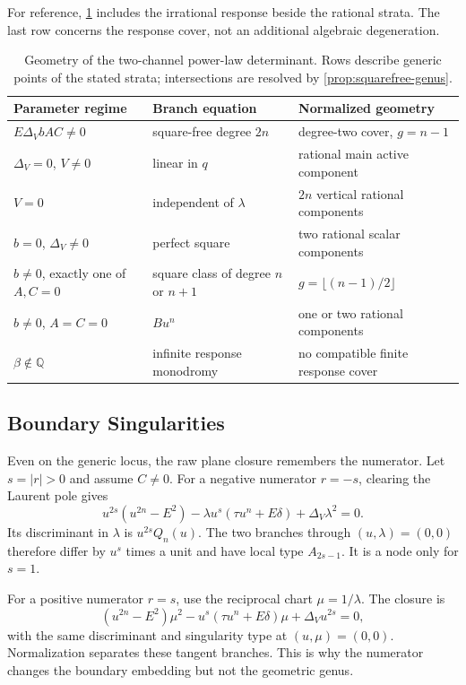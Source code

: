 \documentclass[11pt,reqno]{amsart}
\theoremstyle{remark}
\newcommand{\Q}{\mathbb Q}
\begin{document}
For reference, \cref{tab:regimes} includes the irrational response beside
the rational strata.  The last row concerns the response cover, not an
additional algebraic degeneration.

\begin{table}[t]
\centering
\caption{Geometry of the two-channel power-law determinant.  Rows describe
generic points of the stated strata; intersections are resolved by
\cref{prop:squarefree-genus}.}
\label{tab:regimes}
\begin{tabular}{@{}p{}p{}p{}@{}}
\toprule
Parameter regime & Branch equation & Normalized geometry\\
\midrule
$E\Delta_VbAC\ne0$ & square-free degree $2n$ & degree-two cover, $g=n-1$\\
$\Delta_V=0$, $V\ne0$ & linear in $q$ & rational main active component\\
$V=0$ & independent of $\lambda$ & $2n$ vertical rational components\\
$b=0$, $\Delta_V\ne0$ & perfect square & two rational scalar components\\
$b\ne0$, exactly one of $A,C=0$ & square class of degree $n$ or $n+1$ &
$g=\lfloor(n-1)/2\rfloor$\\
$b\ne0$, $A=C=0$ & $Bu^n$ & one or two rational components\\
$\beta\notin\Q$ & infinite response monodromy & no compatible finite response cover\\
\bottomrule
\end{tabular}
\end{table}

\subsection{Boundary Singularities}

Even on the generic locus, the raw plane closure remembers the numerator.
Let $s=|r|>0$ and assume $C\ne0$.  For a negative numerator $r=-s$, clearing
the Laurent pole gives
\begin{equation}\label{eq:negative-r-closure}
 u^{2s}(u^{2n}-E^2)
 -\lambda u^s(\tau u^n+E\delta)
 +\Delta_V\lambda^2=0.
\end{equation}
Its discriminant in $\lambda$ is $u^{2s}Q_n(u)$.  The two branches through
$(u,\lambda)=(0,0)$ therefore differ by $u^s$ times a unit and have local
type $A_{2s-1}$.  It is a node only for $s=1$.

For a positive numerator $r=s$, use the reciprocal chart
$\mu=1/\lambda$.  The closure is
\begin{equation}\label{eq:positive-r-closure}
 (u^{2n}-E^2)\mu^2
 -u^s(\tau u^n+E\delta)\mu
 +\Delta_Vu^{2s}=0,
\end{equation}
with the same discriminant and singularity type at $(u,\mu)=(0,0)$.
Normalization separates these tangent branches.  This is why the numerator
changes the boundary embedding but not the geometric genus.
\end{document}
